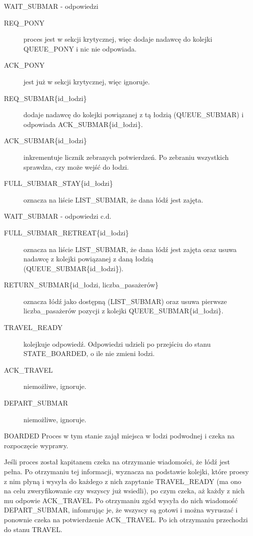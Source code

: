 \documentclass{beamer}
\begin{document}
\begin{frame}{WAIT\_SUBMAR - odpowiedzi}
    \internallinenumbers
    \resetlinenumber[1]
    \begin{description}
        \item [REQ\_PONY] proces jest w sekcji krytycznej, więc dodaje nadawcę do kolejki QUEUE\_PONY i nic nie odpowiada. 
        \item [ACK\_PONY] jest już w sekcji krytycznej, więc ignoruje.
        \item [REQ\_SUBMAR\{id\_łodzi\}] dodaje nadawcę do kolejki powiązanej z tą łodzią (QUEUE\_SUBMAR) i odpowiada ACK\_SUBMAR\{id\_łodzi\}.
        \item [ACK\_SUBMAR\{id\_łodzi\}] inkrementuje licznik zebranych potwierdzeń. Po zebraniu wszystkich sprawdza, czy może wejść do łodzi.
        \item [FULL\_SUBMAR\_STAY\{id\_łodzi\}] oznacza na liście LIST\_SUBMAR, że dana łódź jest zajęta.

    \end{description}
\end{frame}

\begin{frame}{WAIT\_SUBMAR - odpowiedzi c.d.}
    \internallinenumbers
    \begin{description}
        \item [FULL\_SUBMAR\_RETREAT\{id\_łodzi\}] oznacza na liście LIST\_SUBMAR, że dana łódź jest zajęta oraz usuwa nadawcę z kolejki powiązanej z daną łodzią (QUEUE\_SUBMAR\{id\_łodzi\}).
        \item [RETURN\_SUBMAR\{id\_łodzi, liczba\_pasażerów\}] oznacza łódź jako dostępną (LIST\_SUBMAR) oraz usuwa pierwsze liczba\_pasażerów pozycji z kolejki QUEUE\_SUBMAR\{id\_łodzi\}.
        \item [TRAVEL\_READY] kolejkuje odpowiedź. Odpowiedzi udzieli po przejściu do stanu STATE\_BOARDED, o ile nie zmieni łodzi.
        \item [ACK\_TRAVEL] niemożliwe, ignoruje.
        \item [DEPART\_SUBMAR] niemożliwe, ignoruje.
    \end{description}
\end{frame}

\begin{frame}{BOARDED}
    \internallinenumbers
    \resetlinenumber[1]
    Proces w tym stanie zajął miejsca w łodzi podwodnej i czeka na rozpoczęcie wyprawy.

    \vspace{0.4cm}
    Jeśli proces został kapitanem czeka na otrzymanie wiadomości, że łódź jest pełna. Po otrzymaniu tej informacji, wyznacza na podstawie kolejki, które proesy z nim płyną i wysyła do każdego z nich zapytanie TRAVEL\_READY (ma ono na celu zweryfikowanie czy wszyscy już wsiedli), po czym czeka, aż każdy z nich mu odpowie ACK\_TRAVEL. Po otrzymaniu zgód wysyła do nich wiadomość DEPART\_SUBMAR, infomrując je, że wszyscy są gotowi i można wyruszać i ponownie czeka na potwierdzenie ACK\_TRAVEL. Po ich otrzymaniu przechodzi do stanu TRAVEL.
\end{frame}
\end{document}
